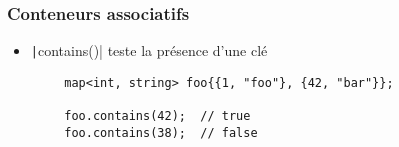 \documentclass[C++.tex]{subfiles}
\begin{document}
\begin{frame}[fragile]
	\frametitle{Conteneurs associatifs}
	\begin{itemize}
		\item \texttt|contains()| teste la présence d'une clé
	\end{itemize}

	\begin{verbatim}
		map<int, string> foo{{1, "foo"}, {42, "bar"}};

		foo.contains(42);  // true
		foo.contains(38);  // false
	\end{verbatim}


\end{frame}
\end{document}
